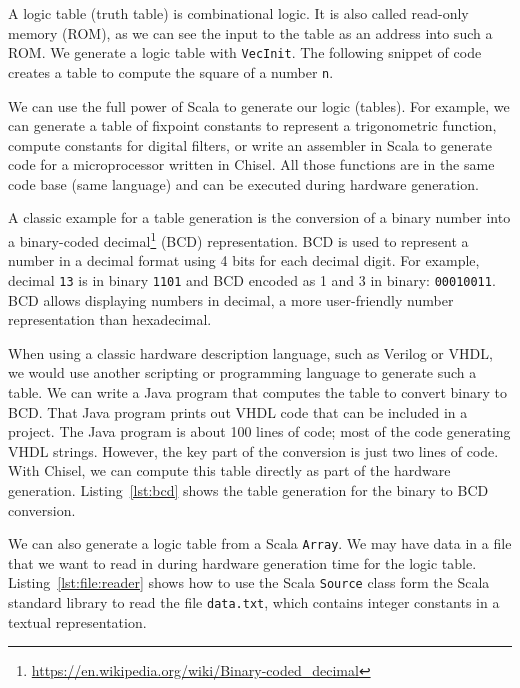 \documentclass[%
    10pt,
    headinclude, footexclude,
    openright, %
    notitlepage,
    cleardoubleempty,
    headsepline,
    pointlessnumbers,
    bibtotoc, idxtotoc,
    ]{scrbook}
\newcommand{\code}[1]{{\lstinline[basicstyle=\small\ttfamily]{#1}}}
\newcommand{\myref}[2]{\href{#1}{#2}}
\renewcommand{\myref}[2]{{#2}{\footnote{\url{#1}}}}
\begin{document}
A logic table (truth table) is combinational logic. It is also called read-only memory (ROM),
as we can see the input to the table as an address into such a ROM.
We generate a logic table with \code{VecInit}.  The following snippet of code creates
a table to compute the square of a number \code{n}.


We can use the full power of Scala to generate our logic (tables).
For example, we can generate a table of fixpoint constants to represent a trigonometric function,
compute constants for digital filters, or write an assembler in Scala
to generate code for a microprocessor written in Chisel. All those functions
are in the same code base (same language) and can be executed during
hardware generation.

A classic example for a table generation is the conversion of a binary number
into a \myref{https://en.wikipedia.org/wiki/Binary-coded_decimal}{binary-coded decimal}
(BCD) representation. BCD is used to represent a number in a decimal
format using 4 bits for each decimal digit. For example, decimal \code{13} is in binary
\code{1101} and BCD encoded as 1 and 3 in binary: \code{00010011}.
BCD allows displaying numbers in decimal, a more user-friendly number
representation than hexadecimal.

When using a classic hardware description language, such as Verilog or VHDL,
we would use another scripting or programming language to generate such a table.
We can write a Java program that computes the table to convert binary to BCD.
That Java program prints out VHDL code that can be included in a project.
The Java program is about 100 lines of code; most of the code generating
VHDL strings. However, the key part of the conversion is just two lines of code.
With Chisel, we can compute this table directly as part of the hardware generation.
Listing~\ref{lst:bcd} shows the table generation for the binary to BCD conversion.



We can also generate a logic table from a Scala \code{Array}.
We may have data in a file that we want to read in during hardware generation
time for the logic table.
Listing~\ref{lst:file:reader} shows how to use the Scala \code{Source}
class form the Scala standard library to read the file \code{data.txt}, which
contains integer constants in a textual representation.
\end{document}
